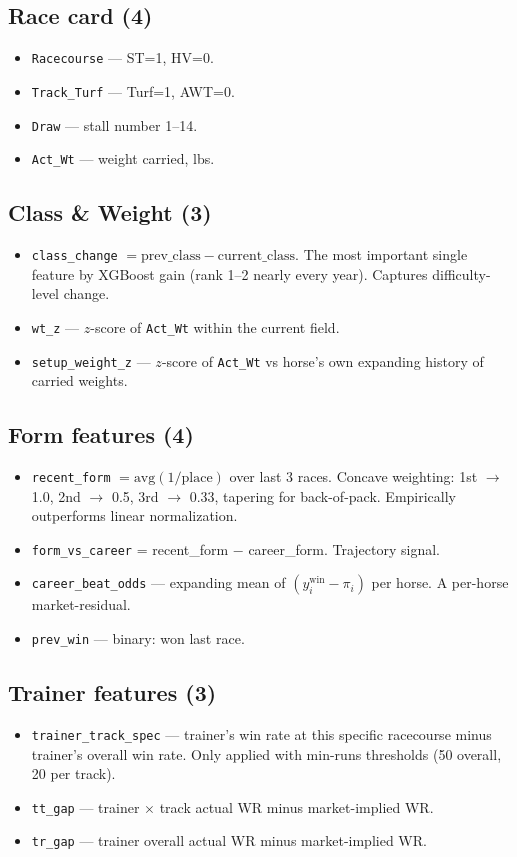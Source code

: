 \documentclass[11pt]{article}
\begin{document}
\subsection{Race card (4)}
\begin{itemize}\item \texttt{Racecourse} --- ST=1, HV=0.
\item \texttt{Track\_Turf} --- Turf=1, AWT=0.
\item \texttt{Draw} --- stall number 1--14.
\item \texttt{Act\_Wt} --- weight carried, lbs.
\end{itemize}

\subsection{Class \& Weight (3)}
\begin{itemize}\item \texttt{class\_change} $= \text{prev\_class} - \text{current\_class}$.
      The most important single feature by XGBoost gain (rank 1--2 nearly
      every year). Captures difficulty-level change.
\item \texttt{wt\_z} --- $z$-score of \texttt{Act\_Wt} within the current field.
\item \texttt{setup\_weight\_z} --- $z$-score of \texttt{Act\_Wt} vs horse's own
      expanding history of carried weights.
\end{itemize}

\subsection{Form features (4)}
\begin{itemize}\item \texttt{recent\_form} $= \text{avg}(1/\text{place})$ over last 3 races.
      Concave weighting: 1st $\to$ 1.0, 2nd $\to$ 0.5, 3rd $\to$ 0.33, tapering
      for back-of-pack. Empirically outperforms linear normalization.
\item \texttt{form\_vs\_career} = recent\_form $-$ career\_form. Trajectory signal.
\item \texttt{career\_beat\_odds} --- expanding mean of
      $(y_i^{\text{win}} - \pi_i)$ per horse. A per-horse market-residual.
\item \texttt{prev\_win} --- binary: won last race.
\end{itemize}

\subsection{Trainer features (3)}
\begin{itemize}\item \texttt{trainer\_track\_spec} --- trainer's win rate at this specific
      racecourse minus trainer's overall win rate. Only applied with
      min-runs thresholds (50 overall, 20 per track).
\item \texttt{tt\_gap} --- trainer $\times$ track actual WR minus market-implied WR.
\item \texttt{tr\_gap} --- trainer overall actual WR minus market-implied WR.
\end{itemize}
\end{document}

